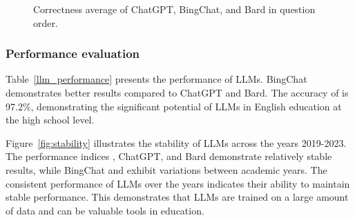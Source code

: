 \documentclass[11pt]{article}
\begin{document}
\begin{figure*}[h!]
\begin{center}
{
		}
	\end{center}
	\caption{Correctness average of ChatGPT, BingChat, and Bard in question order.}
	\label{fig:question_order}
\end{figure*}

\subsubsection{Performance evaluation}

Table~\ref{llm_performance} presents the performance of LLMs. BingChat demonstrates better results compared to ChatGPT and Bard. The accuracy of  is 97.2\%, demonstrating the significant potential of LLMs in English education at the high school level. 

Figure~\ref{fig:stability} illustrates the stability of LLMs across the years 2019-2023. The performance indices , ChatGPT, and Bard demonstrate relatively stable results, while BingChat and  exhibit variations between academic years. The consistent performance of LLMs over the years indicates their ability to maintain stable performance. This demonstrates that LLMs are trained on a large amount of data and can be valuable tools in education. 
\end{document}
